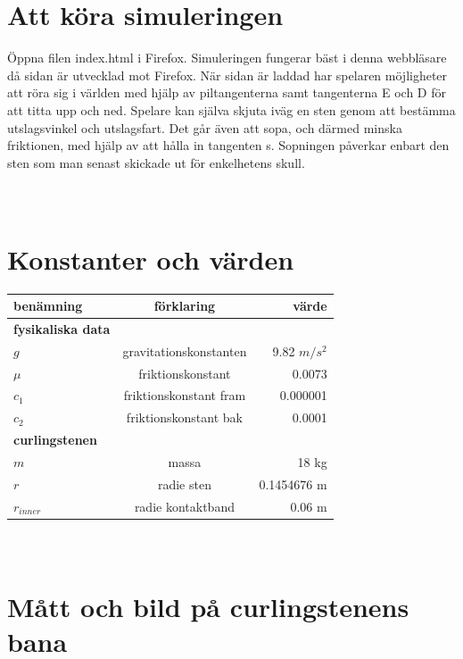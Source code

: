 \documentclass[11pt]{article} %
\begin{document}
\section{Att köra simuleringen}
Öppna filen index.html i Firefox. Simuleringen fungerar bäst i denna webbläsare då sidan är utvecklad mot Firefox. När sidan är laddad har spelaren möjligheter att röra sig i världen med hjälp av piltangenterna samt tangenterna E och D för att titta upp och ned. Spelare kan själva skjuta iväg en sten genom att bestämma utslagsvinkel och utslagsfart. Det går även att sopa, och därmed minska friktionen, med hjälp av att hålla in tangenten s. Sopningen påverkar enbart den sten som man senast skickade ut för enkelhetens skull. 


\appendix
\section{\\Konstanter och värden} \label{App:AppendixA}


\begin{tabular}{l | c | r}
benämning & förklaring & värde \\ \hline\hline
\textbf{fysikaliska data} & & \\ \hline
$g$ & gravitationskonstanten & 9.82 $m/s^2$\\
$\mu$ & friktionskonstant & 0.0073\\
$c_1$ & friktionskonstant fram & 0.000001\\
$c_2$ & friktionskonstant bak & 0.0001\\
\textbf{curlingstenen} & & \\ \hline
$m$ & massa & 18 kg\\
$r$ & radie sten & 0.1454676 m\\
$r_{inner}$ & radie kontaktband & 0.06 m\\ \hline
\end{tabular}

\section{\\Mått och bild på curlingstenens bana} \label{App:AppendixB}
\end{document}
